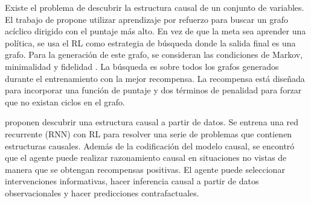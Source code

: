 Existe el problema de descubrir la estructura causal de un conjunto de variables. El trabajo  de \citet{zhu2019causal} propone utilizar aprendizaje por refuerzo para buscar un grafo acíclico dirigido con el puntaje más alto. En vez de que la meta sea aprender una política, se usa el RL como estrategia de búsqueda donde la salida final es una grafo. Para la generación de este grafo, se consideran las condiciones de Markov, minimalidad y fidelidad \cite{spirtes2000causation}. La búsqueda es sobre todos los grafos generados durante el entrenamiento con la mejor recompensa. La recompensa está diseñada para incorporar una función de puntaje y dos términos de penalidad para forzar que no existan ciclos en el grafo.

\citet{dasgupta2019causal} proponen descubrir una estructura causal a partir de datos.
Se entrena una red recurrente (RNN) con RL para resolver
una serie de problemas que contienen estructuras causales. Además de la codificación del modelo causal, se encontró que el agente
puede realizar razonamiento causal en situaciones no vistas de manera que se obtengan
recompensas positivas. El agente puede seleccionar intervenciones informativas, hacer inferencia
causal a partir de datos observacionales y hacer predicciones contrafactuales. 


